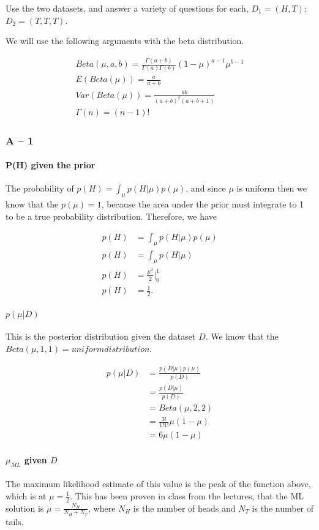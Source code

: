 \documentclass[paper=a4, fontsize=11pt]{scrartcl} %
\begin{document}
Use the two datasets, and answer a variety of questions for each, $D_1 = (H,T)$; $D_2 = (T,T,T)$.

We will use the following arguments with the beta distribution.

\begin{align}
Beta(\mu,a,b) = \frac{\Gamma(a+b)}{\Gamma(a)\Gamma(b)}(1-\mu)^{a-1}\mu^{b-1} \\
E(Beta(\mu) ) = \frac{a}{a+b} \\
Var(Beta(\mu) ) = \frac{ab}{(a+b)^2(a+b+1)} \\
\Gamma(n) = (n-1)!
\end{align}


\subsubsection{A -- 1}
\paragraph{P(H) given the prior}
The probability of $p(H) = \int_{\mu} p(H|\mu)p(\mu)$, and since $\mu$ is uniform then we know that the $p(\mu) =1$, because the area under the prior must integrate to 1 to be a true probability distribution.  Therefore, we have

\begin{align}
p(H) &= \int_{\mu} p(H|\mu)p(\mu) \\
p(H) &= \int_{\mu} p(H|\mu) \\
p(H) &= \frac{\mu^2}{2} |_{0}^{1} \\
p(H) &= \frac{1}{2}.
\end{align}

\paragraph{$p(\mu|D)$}
This is the posterior distribution given the dataset $D$.  We know that the $Beta(\mu,1,1) = uniform distribution$.

\begin{align}
p(\mu|D) &= \frac{p(D|\mu)p(\mu)}{p(D)} \\
&= \frac{p(D|\mu)}{p(D)} \\
&= Beta(\mu,2,2) \\
&= \frac{3!}{1!1!}\mu(1-\mu) \\
& = 6 \mu(1-\mu)
\end{align}

\paragraph{$\mu_{ML}$ given $D$}
The maximum likelihood estimate of this value is the peak of the function above, which is at $\mu = \frac{1}{2}$.
This has been proven in class from the lectures, that the ML solution is  $\mu = \frac{N_H}{N_H+N_T}$, where $N_H$ is the number of heads and $N_T$ is the number of tails.
 
\end{document}
